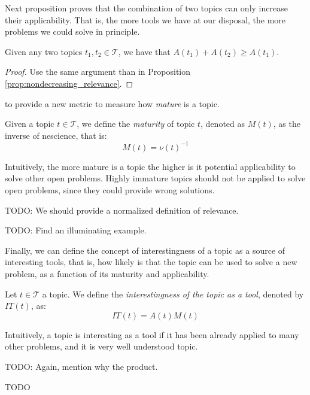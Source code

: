 Next proposition proves that the combination of two topics can only increase their applicability. That is, the more tools we have at our disposal, the more problems we could solve in principle.

\begin{proposition}
Given any two topics $t_1, t_2 \in \mathcal{T}$, we have that $A(t_1) + A(t_2) \geq A(t_1)$.
\end{proposition}
\begin{proof}
Use the same argument than in Proposition \ref{prop:nondecreasing_relevance}.
\end{proof}

to provide a new metric to measure how \emph{mature} is a topic.

\begin{definition}
Given a topic $t \in \mathcal{T}$, we define the \emph{maturity} of topic $t$, denoted as $M(t)$, as the inverse of nescience, that is:
\[
M(t) = \nu(t)^{-1}
\]
\end{definition}

Intuitively, the more mature is a topic the higher is it potential applicability to solve other open problems. Highly immature topics should not be applied to solve open problems, since they could provide wrong solutions.

{\color{red} TODO: We should provide a normalized definition of relevance.}

\begin{example}
{\color{red} TODO: Find an illuminating example.}
\end{example}

Finally, we can define the concept of interestingness of a topic as a source of interesting tools, that is, how likely is that the topic can be used to solve a new problem, as a function of its maturity and applicability.

\begin{definition}
Let $t \in \mathcal{T}$ a topic. We define the \emph{interestingness of the topic as a tool}, denoted by $IT(t)$, as:
\[
IT(t) = A(t) M(t)
\]
\end{definition}

Intuitively, a topic is interesting as a tool if it has been already applied to many other problems, and it is very well understood topic.

{\color{red} TODO: Again, mention why the product.}

\begin{example}
{\color{red} TODO}
\end{example}

